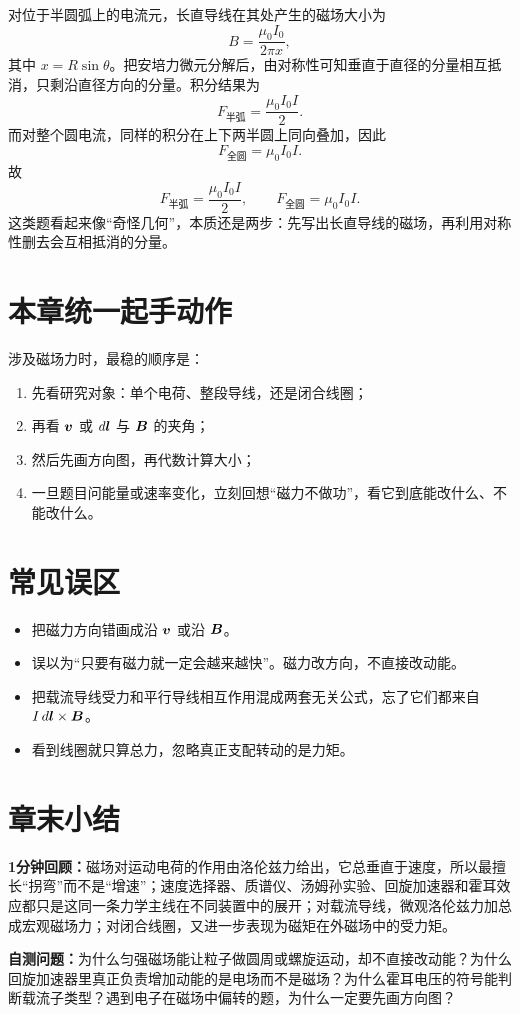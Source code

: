 \documentclass[lang=cn,11pt]{elegantbook}
\newcommand{\summaryline}[1]{\par\noindent\textbf{1分钟回顾：}#1\par}
\newcommand{\chapterselfcheck}[1]{\par\noindent\textbf{自测问题：}#1\par}
\begin{document}
\begin{solution}
对位于半圆弧上的电流元，长直导线在其处产生的磁场大小为
\[
B=\frac{\mu_0 I_0}{2\pi x},
\]
其中 \(x=R\sin\theta\)。把安培力微元分解后，由对称性可知垂直于直径的分量相互抵消，只剩沿直径方向的分量。积分结果为
\[
F_{\text{半弧}}=\frac{\mu_0 I_0 I}{2}.
\]
而对整个圆电流，同样的积分在上下两半圆上同向叠加，因此
\[
F_{\text{全圆}}=\mu_0 I_0 I.
\]
故
\[
\boxed{
F_{\text{半弧}}=\frac{\mu_0 I_0 I}{2},
\qquad
F_{\text{全圆}}=\mu_0 I_0 I.
}
\]
这类题看起来像“奇怪几何”，本质还是两步：先写出长直导线的磁场，再利用对称性删去会互相抵消的分量。
\end{solution}

\section{本章统一起手动作}

涉及磁场力时，最稳的顺序是：
\begin{enumerate}
  \item 先看研究对象：单个电荷、整段导线，还是闭合线圈；
  \item 再看 \(\vb*{v}\) 或 \(d\vb*{l}\) 与 \(\vb*{B}\) 的夹角；
  \item 然后先画方向图，再代数计算大小；
  \item 一旦题目问能量或速率变化，立刻回想“磁力不做功”，看它到底能改什么、不能改什么。
\end{enumerate}

\section{常见误区}

\begin{itemize}
  \item 把磁力方向错画成沿 \(\vb*{v}\) 或沿 \(\vb*{B}\)。
  \item 误以为“只要有磁力就一定会越来越快”。磁力改方向，不直接改动能。
  \item 把载流导线受力和平行导线相互作用混成两套无关公式，忘了它们都来自 \(I\,d\vb*{l}\times \vb*{B}\)。
  \item 看到线圈就只算总力，忽略真正支配转动的是力矩。
\end{itemize}

\section{章末小结}

\summaryline{磁场对运动电荷的作用由洛伦兹力给出，它总垂直于速度，所以最擅长“拐弯”而不是“增速”；速度选择器、质谱仪、汤姆孙实验、回旋加速器和霍耳效应都只是这同一条力学主线在不同装置中的展开；对载流导线，微观洛伦兹力加总成宏观磁场力；对闭合线圈，又进一步表现为磁矩在外磁场中的受力矩。}
\chapterselfcheck{为什么匀强磁场能让粒子做圆周或螺旋运动，却不直接改动能？为什么回旋加速器里真正负责增加动能的是电场而不是磁场？为什么霍耳电压的符号能判断载流子类型？遇到电子在磁场中偏转的题，为什么一定要先画方向图？}
\end{document}

